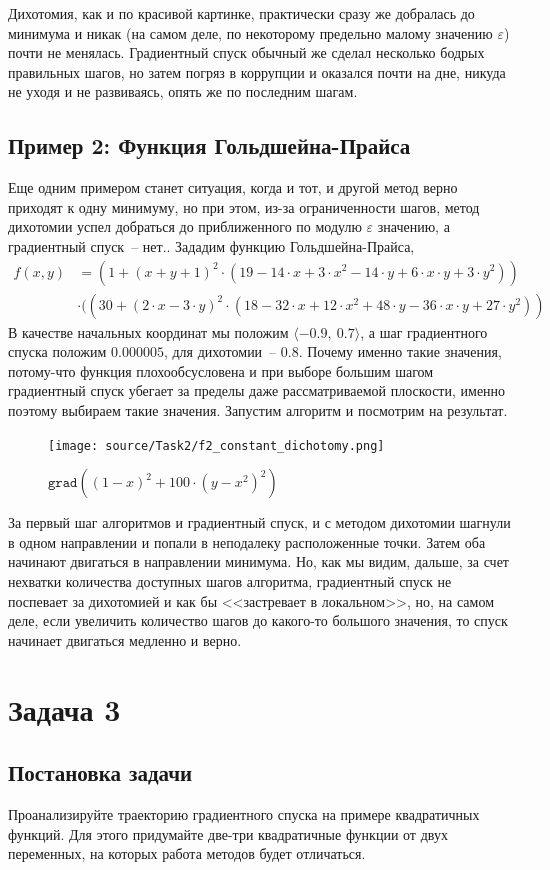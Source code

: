 \documentclass[12pt, a4paper, oneside, final]{article}
\begin{document}
	Дихотомия, как и по красивой картинке, практически сразу же добралась до минимума и никак (на самом деле, по некоторому предельно малому значению $\varepsilon$) почти не менялась. Градиентный спуск обычный же сделал несколько бодрых правильных шагов, но затем погряз в коррупции и оказался почти на дне, никуда не уходя и не развиваясь, опять же по последним шагам.
	\subsection*{Пример 2: Функция Гольдшейна-Прайса}
	Еще одним примером станет ситуация, когда и тот, и другой метод верно приходят к одну минимуму, но при этом, из-за ограниченности шагов, метод дихотомии успел добраться до приближенного по модулю $\varepsilon$ значению, а градиентный спуск~-- нет.. Зададим функцию Гольдшейна-Прайса,
	\begin{align*}
		f(x, y) &= (1 + (x + y + 1)^2 \cdot (19 - 14 \cdot x + 3 \cdot x^2-14 \cdot y + 6 \cdot x \cdot y + 3 \cdot y^2)) \\
		&\cdot ((30 + (2 \cdot x - 3 \cdot y)^2 \cdot (18 - 32 \cdot x + 12 \cdot x^2 + 48 \cdot y - 36 \cdot x \cdot y+27 \cdot y^2))
	\end{align*}
	В качестве начальных координат мы положим $\langle -0.9, ~ 0.7\rangle$, а шаг градиентного спуска положим $0.000005$, для дихотомии~-- $0.8$. Почему именно такие значения, потому-что функция плохообсусловена и при выборе большим шагом градиентный спуск убегает за пределы даже рассматриваемой плоскости, именно поэтому выбираем такие значения. Запустим алгоритм и посмотрим на результат.
	\begin{figure}[H]
		\centering
		\texttt{[image: source/Task2/f2\_constant\_dichotomy.png]}
		\caption{$\texttt{grad}((1 - x)^{2} + 100 \cdot (y - x^2)^2)$}
	\end{figure}
	За первый шаг алгоритмов и градиентный спуск, и с методом дихотомии шагнули в одном направлении и попали в неподалеку расположенные точки. Затем оба начинают двигаться в направлении минимума. Но, как мы видим, дальше, за счет нехватки количества доступных шагов алгоритма, градиентный спуск не поспевает за дихотомией и как бы <<застревает в локальном>>, но, на самом деле, если увеличить количество шагов до какого-то большого значения, то спуск начинает двигаться медленно и верно.
	\newpage
	\section*{Задача 3}
	\subsection*{Постановка задачи}
	Проанализируйте траекторию градиентного спуска на примере квадратичных функций. Для этого придумайте две-три квадратичные функции от двух переменных, на которых работа методов будет отличаться.
\end{document}
